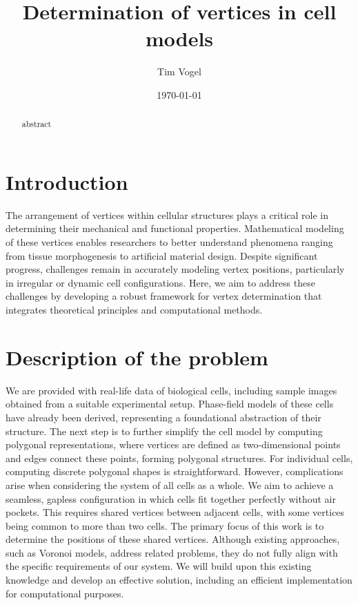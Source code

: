 \documentclass[12pt]{article}
\title{Determination of vertices in cell models}
\author{Tim Vogel}
\date{\today}
\begin{document}
\maketitle

\begin{abstract}
abstract
\end{abstract}

\section{Introduction}
The arrangement of vertices within cellular structures plays a critical role in determining their mechanical and functional properties. Mathematical modeling of these vertices enables researchers to better understand phenomena ranging from tissue morphogenesis to artificial material design. Despite significant progress, challenges remain in accurately modeling vertex positions, particularly in irregular or dynamic cell configurations. Here, we aim to address these challenges by developing a robust framework for vertex determination that integrates theoretical principles and computational methods.

\section{Description of the problem}
We are provided with real-life data of biological cells, including sample images obtained from a suitable experimental setup. 
Phase-field models of these cells have already been derived, representing a foundational abstraction of their structure. 
The next step is to further simplify the cell model by computing polygonal representations, where vertices are defined as two-dimensional points and edges connect these points, forming polygonal structures.
For individual cells, computing discrete polygonal shapes is straightforward. 
However, complications arise when considering the system of all cells as a whole. 
We aim to achieve a seamless, gapless configuration in which cells fit together perfectly without air pockets. 
This requires shared vertices between adjacent cells, with some vertices being common to more than two cells.
The primary focus of this work is to determine the positions of these shared vertices. 
Although existing approaches, such as Voronoi models, address related problems, they do not fully align with the specific requirements of our system. 
We will build upon this existing knowledge and develop an effective solution, including an efficient implementation for computational purposes.
\end{document}
